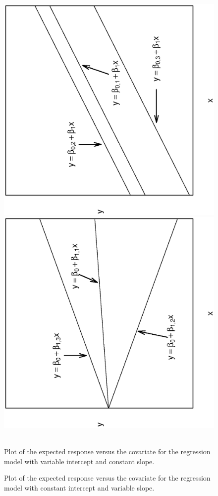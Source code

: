 \begin{figure}[htp]
  \begin{center}
    \includegraphics[width=1\textwidth,angle=270,scale=0.45]{Chapter4/F4TheoryVarIntConSlope.ps}
    \includegraphics[width=1\textwidth,angle=270,scale=0.45]{Chapter4/F4TheoryConIntVarSlope.ps} ~~~\hfill
     \parbox[t]{2.5in}{\caption{\label{F4:TheoryVarIntConSlope} \small  Plot of the expected response versus the covariate for the regression model
with variable intercept and constant slope.}} \hfill
    \parbox[t]{2.5in}{\caption{\label{F4:TheoryConIntVarSlope} \small  Plot of the expected response versus the covariate for the regression model
with constant intercept and variable slope.}}
  \end{center}
\end{figure}


